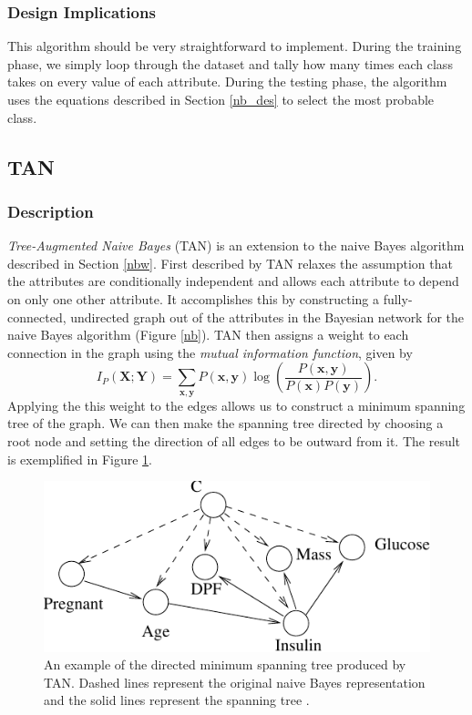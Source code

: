 \documentclass{article}
\newcommand{\ve}[1]{\boldsymbol{\mathbf{#1}}}
\begin{document}
			\subsubsection{Design Implications}
				This algorithm should be very straightforward to implement. During the training phase, we simply loop through the dataset and tally how many times each class takes on every value of each attribute. During the testing phase, the algorithm uses the equations described in Section \ref{nb_des} to select the most probable class.
		\subsection{TAN}
			\subsubsection{Description}
				\textit{Tree-Augmented Naive Bayes} (TAN) is an extension to the naive Bayes algorithm described in Section \ref{nbw}. First described by \cite{Friedman1997} TAN relaxes the assumption that the attributes are conditionally independent and allows each attribute to depend on only one other attribute. It accomplishes this by constructing a fully-connected, undirected graph out of the attributes in the Bayesian network for the naive Bayes algorithm (Figure \ref{nb}). TAN then assigns a weight to each connection in the graph using the \textit{mutual information function}, given by
				\begin{equation*}
					I_P(\ve{X};\ve{Y}) = \sum_{\ve{x},\ve{y}} P(\ve{x},\ve{y}) \log \left( \frac{P(\ve{x},\ve{y})}{P(\ve{x})P(\ve{y})} \right).
				\end{equation*}
				Applying the this weight to the edges allows us to construct a minimum spanning tree of the graph. We can then make the spanning tree directed by choosing a root node and setting the direction of all edges to be outward from it. The result is exemplified in Figure \ref{tan}.
				\begin{figure}[h]
					\centering
					\includegraphics{fig/tan}
					\caption{An example of the directed minimum spanning tree produced by TAN. Dashed lines represent the original naive Bayes representation and the solid lines represent the spanning tree \cite{Friedman1997}.}
					\label{tan}
				\end{figure}
\end{document}
